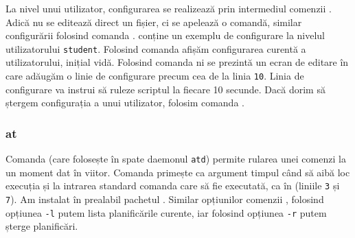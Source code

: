 La nivel unui utilizator, configurarea  se realizează prin intermediul comenzii .
Adică nu se editează direct un fișier, ci se apelează o comandă, similar configurării  folosind comanda .
 conține un exemplu de configurare  la nivelul utilizatorului \texttt{student}.
Folosind comanda  afișăm configurarea curentă a utilizatorului, inițial vidă.
Folosind comanda  ni se prezintă un ecran de editare în care adăugăm o linie de configurare precum cea de la linia \texttt{10}.
Linia de configurare va instrui  să ruleze scriptul  la fiecare 10 secunde.
Dacă dorim să ștergem configurația  a unui utilizator, folosim comanda .


\subsubsection{at}
\label{sec:auto:system:sched:at}

Comanda  (care folosește în spate daemonul \texttt{atd}) permite rularea unei comenzi la un moment dat în viitor.
Comanda primește ca argument timpul când să aibă loc execuția și la intrarea standard comanda care să fie executată, ca în  (liniile \texttt{3} și \texttt{7}).
Am instalat în prealabil pachetul .
Similar opțiunilor comenzii , folosind opțiunea \texttt{-l} putem lista planificările curente, iar folosind opțiunea \texttt{-r} putem șterge planificări.

